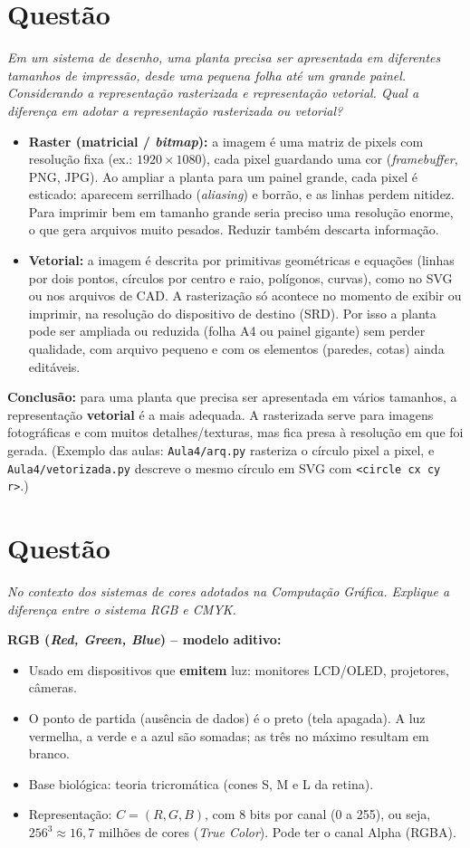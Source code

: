 \documentclass{article}
\newcounter{questao}
\newcommand{\questao}[1]{%
      \stepcounter{questao}%
      \section*{Questão \arabic{questao}}%
      \textit{#1}\par\medskip}
\begin{document}
\questao{Em um sistema de desenho, uma planta precisa ser apresentada em diferentes tamanhos de impressão, desde uma pequena folha até um grande painel. Considerando a representação rasterizada e representação vetorial. Qual a diferença em adotar a representação rasterizada ou vetorial?}

\begin{itemize}
      \item \textbf{Raster (matricial / \textit{bitmap}):} a imagem é uma matriz de pixels com resolução fixa (ex.: $1920\times1080$), cada pixel guardando uma cor (\textit{framebuffer}, PNG, JPG). Ao ampliar a planta para um painel grande, cada pixel é esticado: aparecem serrilhado (\textit{aliasing}) e borrão, e as linhas perdem nitidez. Para imprimir bem em tamanho grande seria preciso uma resolução enorme, o que gera arquivos muito pesados. Reduzir também descarta informação.
      \item \textbf{Vetorial:} a imagem é descrita por primitivas geométricas e equações (linhas por dois pontos, círculos por centro e raio, polígonos, curvas), como no SVG ou nos arquivos de CAD. A rasterização só acontece no momento de exibir ou imprimir, na resolução do dispositivo de destino (SRD). Por isso a planta pode ser ampliada ou reduzida (folha A4 ou painel gigante) sem perder qualidade, com arquivo pequeno e com os elementos (paredes, cotas) ainda editáveis.
\end{itemize}

\textbf{Conclusão:} para uma planta que precisa ser apresentada em vários tamanhos, a representação \textbf{vetorial} é a mais adequada. A rasterizada serve para imagens fotográficas e com muitos detalhes/texturas, mas fica presa à resolução em que foi gerada. (Exemplo das aulas: \texttt{Aula4/arq.py} rasteriza o círculo pixel a pixel, e \texttt{Aula4/vetorizada.py} descreve o mesmo círculo em SVG com \texttt{<circle cx cy r>}.)

\questao{No contexto dos sistemas de cores adotados na Computação Gráfica. Explique a diferença entre o sistema RGB e CMYK.}

\textbf{RGB (\textit{Red, Green, Blue}) -- modelo aditivo:}
\begin{itemize}
      \item Usado em dispositivos que \textbf{emitem} luz: monitores LCD/OLED, projetores, câmeras.
      \item O ponto de partida (ausência de dados) é o preto (tela apagada). A luz vermelha, a verde e a azul são somadas; as três no máximo resultam em branco.
      \item Base biológica: teoria tricromática (cones S, M e L da retina).
      \item Representação: $C = (R, G, B)$, com 8 bits por canal (0 a 255), ou seja, $256^3 \approx 16{,}7$ milhões de cores (\textit{True Color}). Pode ter o canal Alpha (RGBA).
\end{itemize}
\end{document}
